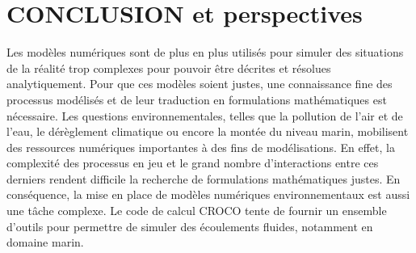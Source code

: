 \documentclass[10pt,a4paper,titlepage]{article}
\begin{document}

\newpage

\section{CONCLUSION et perspectives}
\label{sec:conclusion}


Les modèles numériques sont de plus en plus utilisés pour simuler des situations de la réalité trop complexes pour pouvoir être décrites et résolues analytiquement.
Pour que ces modèles soient justes, une connaissance fine des processus modélisés et de leur traduction en formulations mathématiques est nécessaire.
Les questions environnementales, telles que la pollution de l’air et de l’eau, le dérèglement climatique ou encore la montée du niveau marin, mobilisent des ressources numériques importantes à des fins de modélisations.
En effet, la complexité des processus en jeu et le grand nombre d’interactions entre ces derniers rendent difficile la recherche de formulations mathématiques justes.
En conséquence, la mise en place de modèles numériques environnementaux est aussi une tâche complexe.
Le code de calcul CROCO tente de fournir un ensemble d’outils pour permettre de simuler des écoulements fluides, notamment en domaine marin.
\end{document}
